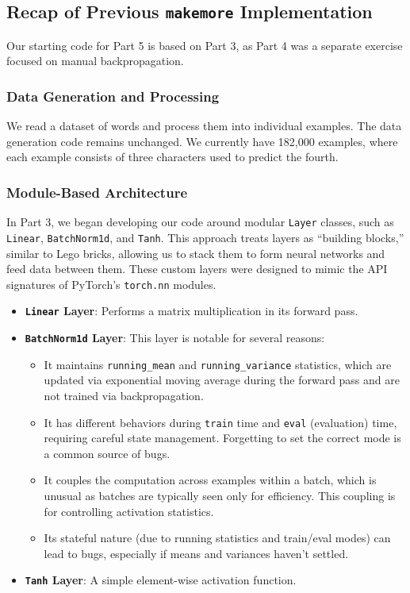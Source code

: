 \subsection{Recap of Previous \texttt{makemore} Implementation}

Our starting code for Part 5 is based on Part 3, as Part 4 was a separate exercise focused on manual backpropagation.

\subsubsection{Data Generation and Processing}
We read a dataset of words and process them into individual examples. The data generation code remains unchanged. We currently have 182,000 examples, where each example consists of three characters used to predict the fourth.

\subsubsection{Module-Based Architecture}
In Part 3, we began developing our code around modular \texttt{Layer} classes, such as \texttt{Linear}, \texttt{BatchNorm1d}, and \texttt{Tanh}. This approach treats layers as ``building blocks,'' similar to Lego bricks, allowing us to stack them to form neural networks and feed data between them. These custom layers were designed to mimic the API signatures of PyTorch's \texttt{torch.nn} modules.

\begin{itemize}
    \item \textbf{\texttt{Linear} Layer}: Performs a matrix multiplication in its forward pass.
    \item \textbf{\texttt{BatchNorm1d} Layer}: This layer is notable for several reasons:
    \begin{itemize}
        \item It maintains \texttt{running\_mean} and \texttt{running\_variance} statistics, which are updated via exponential moving average during the forward pass and are not trained via backpropagation.
        \item It has different behaviors during \texttt{train} time and \texttt{eval} (evaluation) time, requiring careful state management. Forgetting to set the correct mode is a common source of bugs.
        \item It couples the computation across examples within a batch, which is unusual as batches are typically seen only for efficiency. This coupling is for controlling activation statistics.
        \item Its stateful nature (due to running statistics and train/eval modes) can lead to bugs, especially if means and variances haven't settled.
    \end{itemize}
    \item \textbf{\texttt{Tanh} Layer}: A simple element-wise activation function.
\end{itemize}

